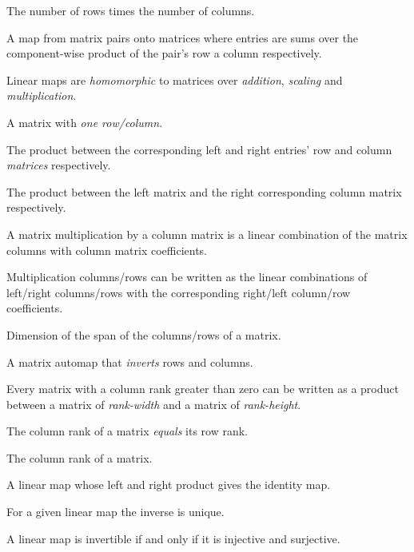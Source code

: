 \begin{multicols}{3}
  The number of rows times the number of columns.

  A map from matrix pairs onto matrices where entries are sums over the component-wise product of
  the pair's row a column respectively.
  
  Linear maps are \textit{homomorphic} to matrices over \textit{addition}, \textit{scaling} and \textit{multiplication}.

  A matrix with \textit{one row/column}.

  The product between the corresponding left and right entries' row and column \textit{matrices} respectively.

  The product between the left matrix and the right corresponding column matrix respectively.

  A matrix multiplication by a column matrix is a linear combination of the
  matrix columns with column matrix coefficients.

  Multiplication columns/rows can be written as the linear combinations of
  left/right columns/rows with
  the corresponding right/left column/row coefficients.
  
  Dimension of the span of the columns/rows of a matrix.

  A matrix automap that \textit{inverts} rows and columns.

  Every matrix with a column rank greater than zero
  can be written as a product between
  a matrix of \textit{rank-width} and a matrix of \textit{rank-height}.

  The column rank of a matrix \textit{equals} its row rank.

  The column rank of a matrix.


  A linear map whose left and right product gives the identity map.

  For a given linear map the inverse is unique.

  A linear map is invertible if and only if it is injective and surjective.


\end{multicols}
